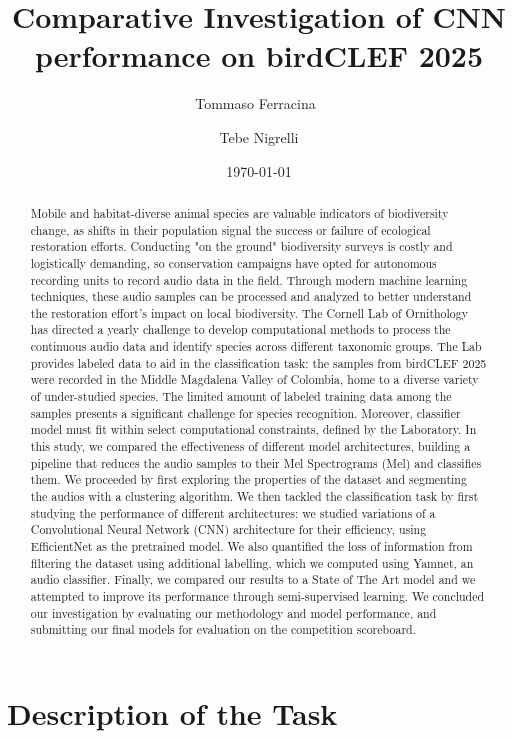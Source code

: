 \documentclass[10pt]{article}
\title{Comparative Investigation of CNN performance on birdCLEF 2025}
\author{
  Tommaso Ferracina\
  \and
  Tebe Nigrelli
}
\date{\today}
\begin{document}
\maketitle

\begin{abstract}
  Mobile and habitat-diverse animal species are valuable indicators of biodiversity change, as shifts in their population signal the success or failure of ecological restoration efforts. Conducting "on the ground" biodiversity surveys is costly and logistically demanding, so conservation campaigns have opted for autonomous recording units to record audio data in the field. Through modern machine learning techniques, these audio samples can be processed and analyzed to better understand the restoration effort's impact on local biodiversity. The Cornell Lab of Ornithology has directed a yearly challenge to develop computational methods to process the continuous audio data and identify species across different taxonomic groups. The Lab provides labeled data to aid in the classification task: the samples from birdCLEF 2025 were recorded in the Middle Magdalena Valley of Colombia, home to a diverse variety of under-studied species. The limited amount of labeled training data among the samples presents a significant challenge for species recognition. Moreover, classifier model must fit within select computational constraints, defined by the Laboratory. In this study, we compared the effectiveness of different model architectures, building a pipeline that reduces the audio samples to their Mel Spectrograms (Mel) and classifies them. We proceeded by first exploring the properties of the dataset and segmenting the audios with a clustering algorithm. We then tackled the classification task by first studying the performance of different architectures: we studied variations of a Convolutional Neural Network (CNN) architecture for their efficiency, using EfficientNet as the pretrained model. We also quantified the loss of information from filtering the dataset using additional labelling, which we computed using Yamnet, an audio classifier. Finally, we compared our results to a State of The Art model and we attempted to improve its performance through semi-supervised learning. We concluded our investigation by evaluating our methodology and model performance, and submitting our final models for evaluation on the competition scoreboard.
\end{abstract}

\section*{Description of the Task}
\end{document}
